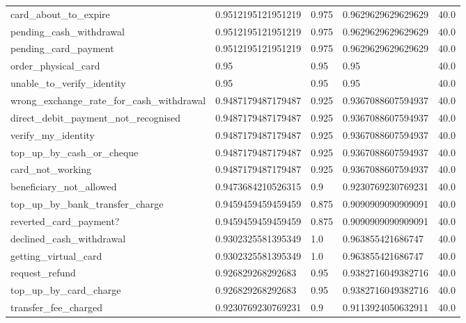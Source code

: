 \begin{table}[!ht]
\begin{tabularx}{\textwidth}{X l l l l}
card\_about\_to\_expire & \num{0.9512195121951219} & \num{0.975} & \num{0.9629629629629629} & \num{40.0} \\
pending\_cash\_withdrawal & \num{0.9512195121951219} & \num{0.975} & \num{0.9629629629629629} & \num{40.0} \\
pending\_card\_payment & \num{0.9512195121951219} & \num{0.975} & \num{0.9629629629629629} & \num{40.0} \\
order\_physical\_card & \num{0.95} & \num{0.95} & \num{0.95} & \num{40.0} \\
unable\_to\_verify\_identity & \num{0.95} & \num{0.95} & \num{0.95} & \num{40.0} \\
wrong\_exchange\_rate\_for\_cash\_withdrawal & \num{0.9487179487179487} & \num{0.925} & \num{0.9367088607594937} & \num{40.0} \\
direct\_debit\_payment\_not\_recognised & \num{0.9487179487179487} & \num{0.925} & \num{0.9367088607594937} & \num{40.0} \\
verify\_my\_identity & \num{0.9487179487179487} & \num{0.925} & \num{0.9367088607594937} & \num{40.0} \\
top\_up\_by\_cash\_or\_cheque & \num{0.9487179487179487} & \num{0.925} & \num{0.9367088607594937} & \num{40.0} \\
card\_not\_working & \num{0.9487179487179487} & \num{0.925} & \num{0.9367088607594937} & \num{40.0} \\
beneficiary\_not\_allowed & \num{0.9473684210526315} & \num{0.9} & \num{0.9230769230769231} & \num{40.0} \\
top\_up\_by\_bank\_transfer\_charge & \num{0.9459459459459459} & \num{0.875} & \num{0.9090909090909091} & \num{40.0} \\
reverted\_card\_payment? & \num{0.9459459459459459} & \num{0.875} & \num{0.9090909090909091} & \num{40.0} \\
declined\_cash\_withdrawal & \num{0.9302325581395349} & \num{1.0} & \num{0.963855421686747} & \num{40.0} \\
getting\_virtual\_card & \num{0.9302325581395349} & \num{1.0} & \num{0.963855421686747} & \num{40.0} \\
request\_refund & \num{0.926829268292683} & \num{0.95} & \num{0.9382716049382716} & \num{40.0} \\
top\_up\_by\_card\_charge & \num{0.926829268292683} & \num{0.95} & \num{0.9382716049382716} & \num{40.0} \\
transfer\_fee\_charged & \num{0.9230769230769231} & \num{0.9} & \num{0.9113924050632911} & \num{40.0} \\

\end{tabularx}
\end{table}
